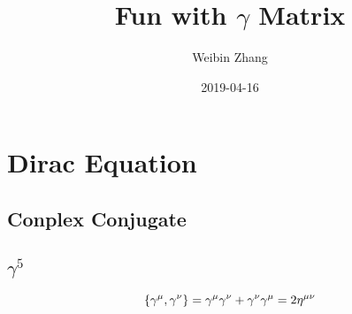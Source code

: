 \documentclass{report}
\title{Fun with $\gamma$ Matrix}
\author{Weibin Zhang}
\date{2019-04-16}
\begin{document}
\section{Dirac Equation}

\subsection{Conplex Conjugate}

\subsection{$\gamma^5$}
$$ \{\gamma^\mu, \gamma^\nu \} = \gamma^\mu\gamma^\nu + \gamma^\nu\gamma^\mu = 2\eta^{\mu\nu} $$

\end{document}
